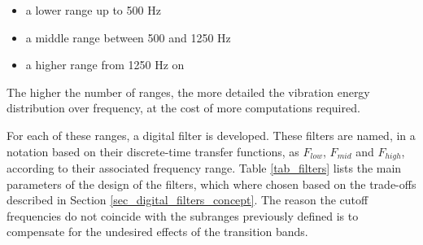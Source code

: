 \documentclass[conference]{IEEEtran}
\begin{document}
\begin{itemize}
	\item a lower range up to 500 Hz
	\item a middle range between 500 and 1250 Hz
	\item a higher range from 1250 Hz on
\end{itemize}

The higher the number of ranges, the more detailed the vibration energy distribution over frequency, at the cost of more computations required.

For each of these ranges, a digital filter is developed. These filters are named, in a notation based on their discrete-time transfer functions, as $F_{low}$, $F_{mid}$ and $F_{high}$, according to their associated frequency range. Table \ref{tab_filters} lists the main parameters of the design of the filters, which where chosen based on the trade-offs described in Section \ref{sec_digital_filters_concept}. The reason the cutoff frequencies do not coincide with the subranges previously defined is to compensate for the undesired effects of the transition bands.


\end{document}
